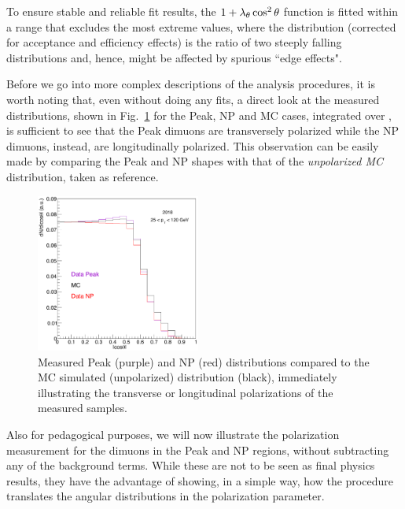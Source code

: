 \vfill\newpage

To ensure stable and reliable fit results, the $1 + \lambda_\theta \cos^2\theta$ function 
is fitted within a \abscosth range that excludes the most extreme values, 
where the distribution (corrected for acceptance and efficiency effects) 
is the ratio of two steeply falling distributions and, hence,
might be affected by spurious ``edge effects".

Before we go into more complex descriptions of the analysis procedures, 
it is worth noting that, even without doing any fits, 
a direct look at the measured \jpsi \abscosth distributions,
shown in Fig.~\ref{fig:costh_full} for the Peak, NP and MC cases, integrated over \pt,
is sufficient to see that the Peak dimuons are transversely polarized 
while the NP dimuons, instead, are longitudinally polarized.
This observation can be easily made by comparing the Peak and NP shapes 
with that of the \emph{unpolarized MC} distribution, taken as reference.

\begin{figure}[h]
\centering
\includegraphics[width=0.48\textwidth]{Figures/chapter3/cos_full2.pdf}
\caption{Measured Peak (purple) and NP (red) \jpsi \abscosth distributions
compared to the MC simulated (unpolarized) distribution (black),
immediately illustrating the transverse or longitudinal polarizations of the
measured samples.}
\label{fig:costh_full}
\end{figure}

\vfill\newpage

Also for pedagogical purposes, 
we will now illustrate the polarization measurement for the dimuons in the 
Peak and NP regions, without subtracting any of the background terms.
While these are not to be seen as final physics results, 
they have the advantage of showing, in a simple way,
how the procedure translates the angular distributions in the \lth polarization parameter.

